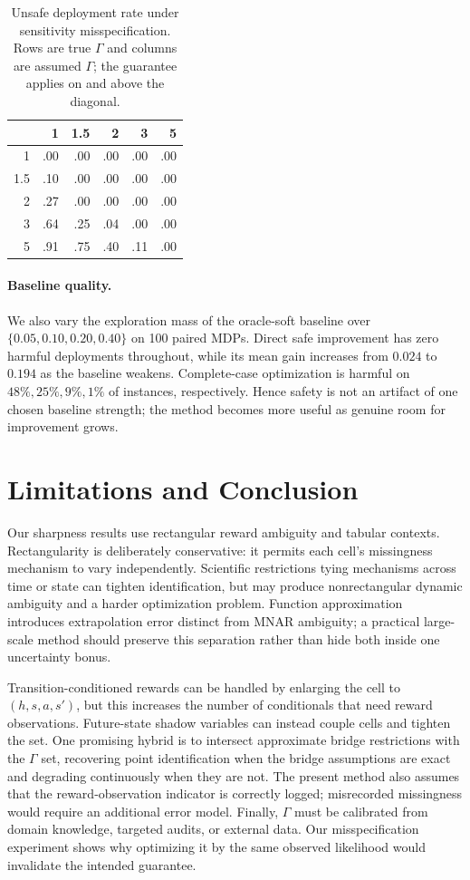 \documentclass[letterpaper]{article}
\theoremstyle{remark}
\begin{document}
\begin{table}[t]
\centering
\small
\caption{Unsafe deployment rate under sensitivity misspecification. Rows are true $\Gamma$ and columns are assumed $\Gamma$; the guarantee applies on and above the diagonal.}
\label{tab:gamma-main}
\begin{tabular}{rrrrrr}
\toprule
 & 1 & 1.5 & 2 & 3 & 5 \\
\midrule
1   & .00 & .00 & .00 & .00 & .00 \\
1.5 & .10 & .00 & .00 & .00 & .00 \\
2   & .27 & .00 & .00 & .00 & .00 \\
3   & .64 & .25 & .04 & .00 & .00 \\
5   & .91 & .75 & .40 & .11 & .00 \\
\bottomrule
\end{tabular}
\end{table}

\paragraph{Baseline quality.}
We also vary the exploration mass of the oracle-soft baseline over $\{0.05,0.10,0.20,0.40\}$ on 100 paired MDPs. Direct safe improvement has zero harmful deployments throughout, while its mean gain increases from $0.024$ to $0.194$ as the baseline weakens. Complete-case optimization is harmful on $48\%,25\%,9\%,1\%$ of instances, respectively. Hence safety is not an artifact of one chosen baseline strength; the method becomes more useful as genuine room for improvement grows.

\section{Limitations and Conclusion}
Our sharpness results use rectangular reward ambiguity and tabular contexts. Rectangularity is deliberately conservative: it permits each cell's missingness mechanism to vary independently. Scientific restrictions tying mechanisms across time or state can tighten identification, but may produce nonrectangular dynamic ambiguity and a harder optimization problem. Function approximation introduces extrapolation error distinct from MNAR ambiguity; a practical large-scale method should preserve this separation rather than hide both inside one uncertainty bonus.

Transition-conditioned rewards can be handled by enlarging the cell to $(h,s,a,s')$, but this increases the number of conditionals that need reward observations. Future-state shadow variables can instead couple cells and tighten the set. One promising hybrid is to intersect approximate bridge restrictions with the $\Gamma$ set, recovering point identification when the bridge assumptions are exact and degrading continuously when they are not. The present method also assumes that the reward-observation indicator is correctly logged; misrecorded missingness would require an additional error model. Finally, $\Gamma$ must be calibrated from domain knowledge, targeted audits, or external data. Our misspecification experiment shows why optimizing it by the same observed likelihood would invalidate the intended guarantee.
\end{document}
